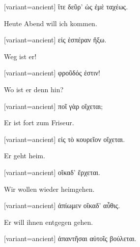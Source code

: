 \begin{greek}[variant=ancient]%
ἴτε δεῦρ' ὡς ἐμὲ ταχέως.

\end{greek}%
\switchcolumn*

Heute Abend will ich kommen.

\switchcolumn

\begin{greek}[variant=ancient]%
εἰς ἑσπέραν ἥξω.

\end{greek}%
\switchcolumn*

Weg ist er!

\switchcolumn

\begin{greek}[variant=ancient]%
φροῦδός ἐστιν!

\end{greek}%
\switchcolumn*

Wo ist er denn hin?

\switchcolumn

\begin{greek}[variant=ancient]%
ποῖ γὰρ οἴχεται;

\end{greek}%
\switchcolumn*

Er ist fort zum Friseur.

\switchcolumn

\begin{greek}[variant=ancient]%
εἰς τὸ κουρεῖον οἴχεται.

\end{greek}%
\switchcolumn*

Er geht heim.

\switchcolumn

\begin{greek}[variant=ancient]%
οἴκαδ' ἔρχεται.

\end{greek}%
\switchcolumn*

Wir wollen wieder heimgehen.

\switchcolumn

\begin{greek}[variant=ancient]%
ἀπίωμεν οἴκαδ' αὖθις.

\end{greek}%
\switchcolumn*

Er will ihnen entgegen gehen.

\switchcolumn

\begin{greek}[variant=ancient]%
ἀπαντῆσαι αὐτοῖς βούλεται.

\end{greek}%
\switchcolumn*

